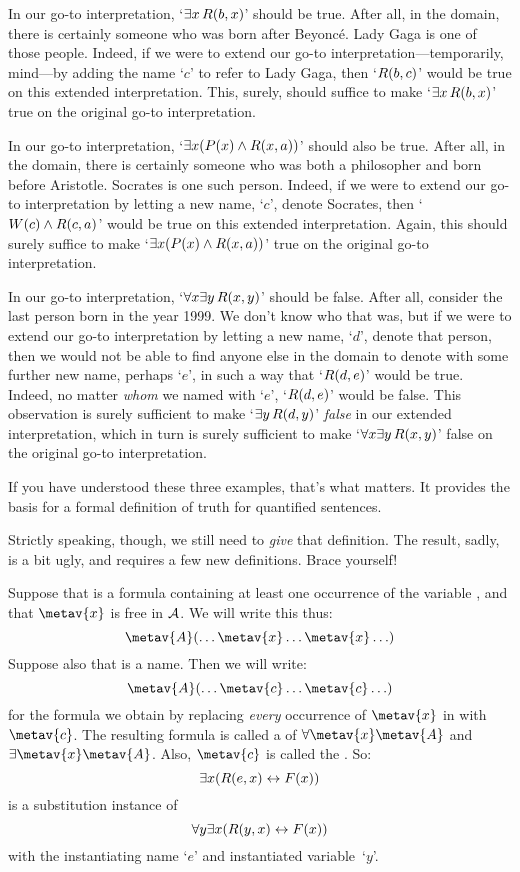 In our go-to interpretation, `$\exists x\, \mathord{R}(b,x)$' should be true. After all, in the domain, there is certainly someone who was born after Beyonc\'e. Lady Gaga is one of those people. Indeed, if we were to extend our go-to interpretation---temporarily, mind---by adding the name `$c$' to refer to Lady Gaga, then `$\mathord{R}(b,c)$' would be true on this extended interpretation. This, surely, should suffice to make `$\exists x\, \mathord{R}(b,x)$' true on the original go-to interpretation.

In our go-to interpretation, `$\exists x (\mathord{P}(x) \wedge \mathord{R}(x,a))$' should also be true. After all, in the domain, there is certainly someone who was both a philosopher and born before Aristotle. Socrates is one such person. Indeed, if we were to extend our go-to interpretation by letting a new name, `$c$', denote Socrates, then `$\mathord{W}(c) \wedge \mathord{R}(c,a)$' would be true on this extended interpretation. Again, this should surely suffice to make `$\exists x (\mathord{P}(x) \wedge \mathord{R}(x,a))$' true on the original go-to interpretation.

In our go-to interpretation, `$\forall x \exists y\, \mathord{R}(x,y)$' should be false. After all, consider the last person born in the year 1999. We don't know who that was, but if we were to extend our go-to interpretation by letting a new name, `$d$', denote that person, then we would not be able to find anyone else in the domain to denote with some further new name, perhaps `$e$', in such a way that `$\mathord{R}(d,e)$' would be true. Indeed, no matter \emph{whom} we named with `$e$', `$\mathord{R}(d,e)$' would be false. This observation is surely sufficient to make `$\exists y\, \mathord{R}(d,y)$' \emph{false} in our extended interpretation, which in turn is surely sufficient to make `$\forall x \exists y\, \mathord{R}(x,y)$' false on the original go-to interpretation.

If you have understood these three examples, that's what matters. It provides the basis for a formal definition of truth for quantified sentences.

Strictly speaking, though, we still need to \emph{give} that definition. The result, sadly, is a bit ugly, and requires a few new definitions. Brace yourself!

Suppose that  is a formula containing at least one occurrence of the variable , and that $\metav{x}$ is free in $\mathcal{A}$. We will write this thus:
$$\metav{A}(\ldots \metav{x} \ldots \metav{x} \ldots)$$
Suppose also that  is a name. Then we will write:
$$\metav{A}(\ldots \metav{c} \ldots \metav{c} \ldots)$$
for the formula we obtain by replacing \emph{every} occurrence of $\metav{x}$ in  with~$\metav{c}$. The resulting formula is called a  of $\forall \metav{x}\metav{A}$ and $\exists\metav{x}\metav{A}$.  Also, $\metav{c}$ is called the . So:
	$$\exists x (\mathord{R}(e,x) \leftrightarrow \mathord{F}(x))$$
is a substitution instance of 
	$$\forall y \exists x (\mathord{R}(y,x) \leftrightarrow \mathord{F}(x))$$
with the instantiating name `$e$' and instantiated variable~`$y$'.

